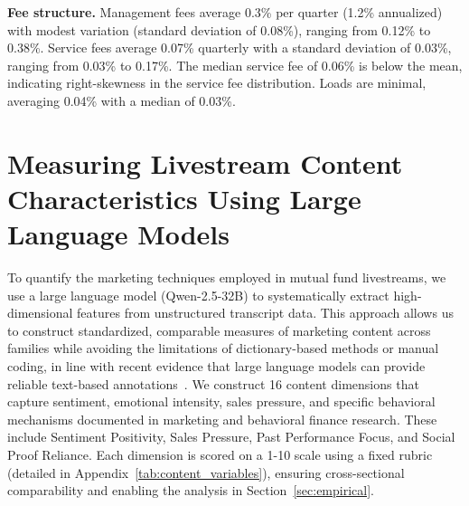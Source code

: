 \documentclass[12pt]{article}
\begin{document}
\textbf{Fee structure.} Management fees average 0.3\% per quarter (1.2\% annualized) with modest variation (standard deviation of 0.08\%), ranging from 0.12\% to 0.38\%. Service fees average 0.07\% quarterly with a standard deviation of 0.03\%, ranging from 0.03\% to 0.17\%. The median service fee of 0.06\% is below the mean, indicating right-skewness in the service fee distribution. Loads are minimal, averaging 0.04\% with a median of 0.03\%.

\section{Measuring Livestream Content Characteristics Using Large Language Models}\label{sec:prompts}
To quantify the marketing techniques employed in mutual fund livestreams, we use a large language model (Qwen-2.5-32B) to systematically extract high-dimensional features from unstructured transcript data. This approach allows us to construct standardized, comparable measures of marketing content across families while avoiding the limitations of dictionary-based methods or manual coding, in line with recent evidence that large language models can provide reliable text-based annotations~\citep{gilardiChatGPTOutperformsCrowd2023}. We construct 16 content dimensions that capture sentiment, emotional intensity, sales pressure, and specific behavioral mechanisms documented in marketing and behavioral finance research. These include Sentiment Positivity, Sales Pressure, Past Performance Focus, and Social Proof Reliance. Each dimension is scored on a 1-10 scale using a fixed rubric (detailed in Appendix~\ref{tab:content_variables}), ensuring cross-sectional comparability and enabling the analysis in Section~\ref{sec:empirical}. %
\end{document}
